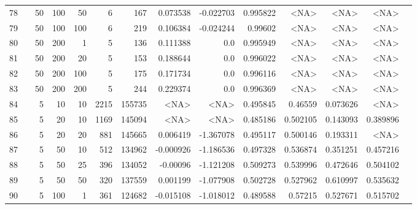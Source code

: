\begin{longtable}{llrrrrrrrrrrrr}
		78  & &           50 &               100 &           50 &           6 &        167 &  0.073538 & -0.022703 &  0.995822 &        <NA> &           <NA> &      <NA> \\
		79  & &           50 &               100 &          100 &           6 &        219 &  0.106384 & -0.024244 &   0.99602 &        <NA> &           <NA> &      <NA> \\
		80  & &           50 &               200 &            1 &           5 &        136 &  0.111388 &       0.0 &  0.995949 &        <NA> &           <NA> &      <NA> \\
		81  & &           50 &               200 &           20 &           5 &        153 &  0.188644 &       0.0 &  0.996022 &        <NA> &           <NA> &      <NA> \\
		82  & &           50 &               200 &          100 &           5 &        175 &  0.171734 &       0.0 &  0.996116 &        <NA> &           <NA> &      <NA> \\
		83  & &           50 &               200 &          200 &           5 &        244 &  0.229374 &       0.0 &  0.996369 &        <NA> &           <NA> &      <NA> \\\midrule
		84  & \multirow[t]{74}{*}{\rotatebox[origin=r]{90}{sbert-lexrank-weighted}}  &            5 &                10 &           10 &        2215 &     155735 &      <NA> &      <NA> &  0.495845 &     0.46559 &       0.073626 &  <NA> \\
		85  & &            5 &                20 &           10 &           1169 &     145094 &      <NA> &      <NA> &  0.485186 &    0.502105 &       0.143093 &  0.389896 \\
		86  & &            5 &                20 &           20 &         881 &     145665 &  0.006419 & -1.367078 &  0.495117 &    0.500146 &       0.193311 &  <NA> \\
		87  & &            5 &                50 &           10 &         512 &     134962 & -0.000926 & -1.186536 &  0.497328 &    0.536874 &       0.351251 &  0.457216 \\
		88  & &            5 &                50 &           25 &         396 &     134052 &  -0.00096 & -1.121208 &  0.509273 &    0.539996 &       0.472646 &  0.504102 \\
		89  & &            5 &                50 &           50 &         320 &     137559 &  0.001199 & -1.077908 &  0.502728 &    0.527962 &       0.610997 &  0.535632 \\
		90  & &            5 &               100 &            1 &         361 &     124682 & -0.015108 & -1.018012 &  0.489588 &     0.57215 &       0.527671 &  0.515702 \\

\end{longtable}
